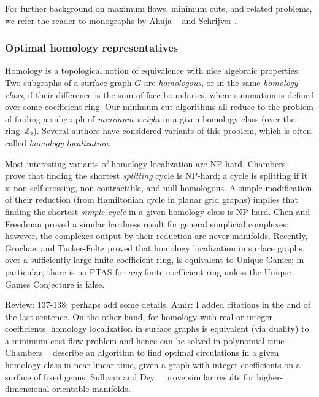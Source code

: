 \documentclass[letterpaper,review]{siamart190516}
\def\Z{\mathbb{Z}}
\def\anote#1{\color{purple}Amir: #1 \color{black}}
\def\rnote#1{\color{red}Review: #1 \color{black}}
\begin{document}
For further background on maximum flows, minimum cuts, and related problems, we refer the reader to monographs by Ahuja \etal\ \cite{amo-nftaa-93} and Schrijver \cite{s-cape-03}.

\subsubsection*{Optimal homology representatives}

Homology is a topological notion of equivalence with nice algebraic properties.  Two subgraphs of a surface graph $G$ are \emph{homologous}, or in the same \emph{homology class}, if their difference is the sum of face boundaries, where summation is defined over some coefficient ring.  Our minimum-cut algorithms all reduce to the problem of finding a subgraph of \emph{minimum weight} in a given homology class (over the ring~$\Z_2$).  Several  authors have considered variants of this problem, which is often called \emph{homology localization}.

Most interesting variants of homology localization are NP-hard.  Chambers \etal~\cite{ccelw-scsih-08} prove that finding the shortest \emph{splitting} cycle is {NP}-hard; a cycle is splitting if it is non-self-crossing, non-contractible, and null-homologous.  A simple modification of their reduction (from Hamiltonian cycle in planar grid graphs) implies that finding the shortest \emph{simple cycle} in a given homology class is {NP}-hard.  Chen and Freedman \cite{cf-qhc-08, cf-qhc2-07} proved a similar hardness result for general simplicial complexes; however, the complexes output by their reduction are never manifolds.  Recently, Grochaw and Tucker-Foltz \cite{gt-ctugc-18} proved that homology localization in surface graphs, over a sufficiently large finite coefficient ring, is equivalent to Unique Games; in particular, there is no PTAS for \emph{any} finite coefficient ring unless the Unique Games Conjecture is false.

\rnote{137-138: perhaps add some details. }\anote{I added citations in the and of the last sentence.}
On the other hand, for homology with real or integer coefficients, homology localization in surface graphs is equivalent (via duality) to a minimum-cost flow problem and hence can be solved in polynomial time~\cite{cen-hfcc-12, s-cath-90}.  Chambers \etal~\cite{cen-hfcc-12} describe an algorithm to find optimal circulations in a given homology class in near-linear time, given a graph with integer coefficients on a surface of fixed genus.  Sullivan \cite{s-cath-90} and Dey \etal\ \cite{dhk-ohctu-11} prove similar results for higher-dimensional orientable manifolds.
\end{document}
